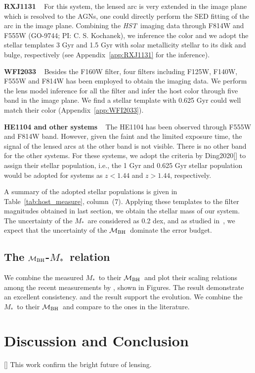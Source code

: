 \documentclass[fleqn,usenatbib]{mnras}
\newcommand{\hst}{{\it HST}}
\newcommand{\mbh}{$\mathcal M_{\rm BH}$}
\newcommand{\mstar}{{$M_*$}}
\begin{document}
{\bf RXJ1131} ~ For this system, the lensed arc is very extended in the image plane which is resolved to the AGNs, one could directly perform the SED fitting of the arc in the image plane. Combining the \hst\ imaging data through F814W and F555W (GO-9744; PI: C. S. Kochanek), we inference the color and we adopt the stellar templates 3 Gyr and 1.5 Gyr with solar metallicity stellar to its disk and bulge, respectively (see Appendix~\ref{app:RXJ1131} for the inference).

{\bf WFI2033} ~ Besides the F160W filter, four filters including F125W, F140W, F555W and F814W has been employed to obtain the imaging data. We perform the lens model inference for all the filter and infer the host color through five band in the image plane. We find a stellar template with 0.625 Gyr could well match their color (Appendix~\ref{app:WFI2033}).

{\bf HE1104 and other systems} ~ The HE1104 has been observed through F555W and F814W band. However, given the faint and the limited exposure time, the signal of the lensed arcs at the other band is not visible. There is no other band for the other systems. For these systems, we adopt the criteria by Ding2020[] to assign their stellar population, i.e., the 1 Gyr and 0.625 Gyr stellar population would be adopted for systems as $z<1.44$ and $z>1.44$, respectively.

A summary of the adopted stellar populations is given in Table~\ref{tab:host_measure}, column~(7). Applying these templates to the filter magnitudes obtained in last section, we obtain the stellar mass of our system. The uncertainty of the \mstar\ are considered as 0.2 dex, and as studied in~\citet{Ding2017a}, we expect that the uncertainty of the \mbh\ dominate the error budget.

\subsection{The \mbh-\mstar\ relation}\label{sec:relation}
We combine the measured \mstar\ to their \mbh\ and plot their scaling relations among the recent measurements by \citet{Ding2020}, shown in Figures. The result demonstrate an excellent consistency. and the result support the evolution. 
We combine the \mstar\ to their \mbh\ and compare to the ones in the literature.

\section{Discussion and Conclusion}
[] This work confirm the bright future of lensing.
\end{document}

